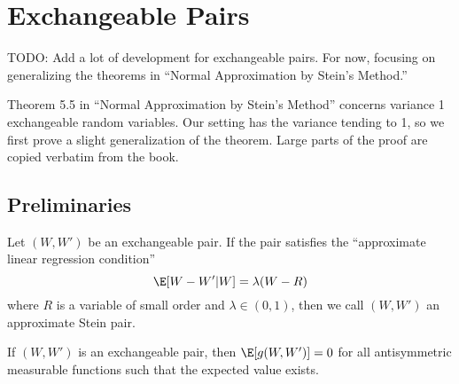\section{Exchangeable Pairs}
TODO: Add a lot of development for exchangeable pairs.  For now, focusing on generalizing the theorems
in ``Normal Approximation by Stein's Method.''

Theorem 5.5 in ``Normal Approximation by Stein's Method'' concerns variance 1 exchangeable
random variables.  Our setting has the variance tending to 1, so we first prove a slight
generalization of the theorem.  Large parts of the proof are copied verbatim from the book.

\subsection{Preliminaries}
\begin{definition}
  Let $(W, W')$ be an exchangeable pair.  If the pair satisfies the ``approximate linear
  regression condition''
  \begin{equation}
    \label{D:approx-stein-pair}
    \E [W - W' | W] = \lambda (W - R)
  \end{equation}
  where $R$ is a variable of small order and $\lambda \in (0, 1)$, then we call $(W, W')$ an
  approximate Stein pair.
\end{definition}

\begin{lemma}
  \label{L:antisymmetric}
  If $(W, W')$ is an exchangeable pair, then $\E [g(W, W')] = 0$ for all antisymmetric
  measurable functions such that the expected value exists.
\end{lemma}

